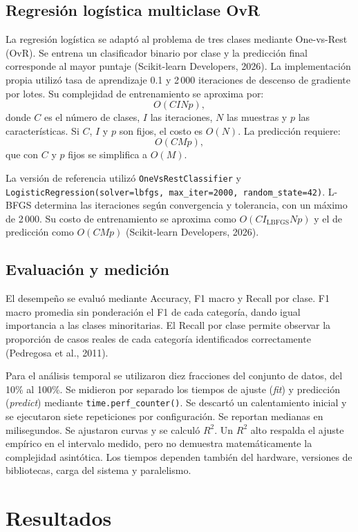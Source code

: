 \documentclass[10pt,a4paper,twocolumn]{article}
\begin{document}
\subsection{Regresión logística multiclase OvR}
La regresión logística se adaptó al problema de tres clases mediante One-vs-Rest (OvR). Se entrena un clasificador binario por clase y la predicción final corresponde al mayor puntaje (Scikit-learn Developers, 2026). La implementación propia utilizó tasa de aprendizaje 0.1 y 2\,000 iteraciones de descenso de gradiente por lotes. Su complejidad de entrenamiento se aproxima por:
\[
O(CINp),
\]
donde $C$ es el número de clases, $I$ las iteraciones, $N$ las muestras y $p$ las características. Si $C$, $I$ y $p$ son fijos, el costo es $O(N)$. La predicción requiere:
\[
O(CMp),
\]
que con $C$ y $p$ fijos se simplifica a $O(M)$.

La versión de referencia utilizó \texttt{OneVsRestClassifier} y \texttt{LogisticRegression(solver=lbfgs, max\_iter=2000, random\_state=42)}. L-BFGS determina las iteraciones según convergencia y tolerancia, con un máximo de 2\,000. Su costo de entrenamiento se aproxima como $O(CI_{\mathrm{LBFGS}}Np)$ y el de predicción como $O(CMp)$ (Scikit-learn Developers, 2026).

\subsection{Evaluación y medición}
El desempeño se evaluó mediante Accuracy, F1 macro y Recall por clase. F1 macro promedia sin ponderación el F1 de cada categoría, dando igual importancia a las clases minoritarias. El Recall por clase permite observar la proporción de casos reales de cada categoría identificados correctamente (Pedregosa et al., 2011).

Para el análisis temporal se utilizaron diez fracciones del conjunto de datos, del 10\% al 100\%. Se midieron por separado los tiempos de ajuste (\textit{fit}) y predicción (\textit{predict}) mediante \texttt{time.perf\_counter()}. Se descartó un calentamiento inicial y se ejecutaron siete repeticiones por configuración. Se reportan medianas en milisegundos. Se ajustaron curvas y se calculó $R^2$. Un $R^2$ alto respalda el ajuste empírico en el intervalo medido, pero no demuestra matemáticamente la complejidad asintótica. Los tiempos dependen también del hardware, versiones de bibliotecas, carga del sistema y paralelismo.

\section{Resultados}
\end{document}
